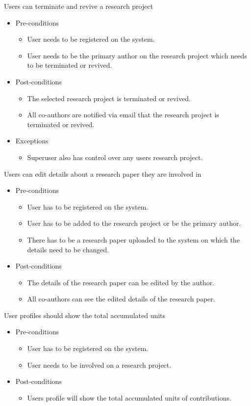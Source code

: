 \documentclass[a4paper,12pt]{report}
\begin{document}
	Users can terminate and revive a research project
	\begin{itemize}
		\item Pre-conditions
			\begin{itemize}
				\item User needs to be registered on the system.
				\item User needs to be the primary author on the research project which needs to be terminated or revived.
			\end{itemize}
		\item Post-conditions
			\begin{itemize}
				\item The selected research project is terminated or revived.
				\item All co-authors are notified via email that the research project is terminated or revived.
			\end{itemize}
		\item Exceptions
			\begin{itemize}
				\item Superuser also has control over any users research project.
			\end{itemize}
	\end{itemize}

	Users can edit details about a research paper they are involved in
	\begin{itemize}
		\item Pre-conditions
			\begin{itemize}
				\item User has to be registered on the system.
				\item User has to be added to the research project or be the primary author.
				\item There has to be a research paper uploaded to the system on which the details need to be changed.
			\end{itemize}
		\item Post-conditions
			\begin{itemize}
				\item The details of the research paper can be edited by the author.
				\item All co-authors can see the edited details of the research paper.
			\end{itemize}
	\end{itemize}

	User profiles should show the total accumulated units
	\begin{itemize}
		\item Pre-conditions
			\begin{itemize}
				\item User has to be registered on the system.
				\item User needs to be involved on a research project.
			\end{itemize}
		\item Post-conditions
			\begin{itemize}
				\item Users profile will show the total accumulated units of contributions.
			\end{itemize}
	\end{itemize}
\end{document}
